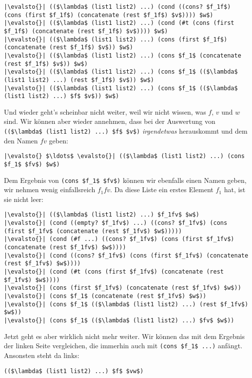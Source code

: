 \begin{enumerate}
\begin{lstlisting}
|\evalsto{}| (($\lambda$ (list1 list2) ...) (cond ((cons? $f_1f$) (cons (first $f_1f$) (concatenate (rest $f_1f$) $v$)))) $w$)
|\evalsto{}| (($\lambda$ (list1 list2) ...) (cond (#t (cons (first $f_1f$) (concatenate (rest $f_1f$) $v$)))) $w$)
|\evalsto{}| (($\lambda$ (list1 list2) ...) (cons (first $f_1f$) (concatenate (rest $f_1f$) $v$)) $w$)
|\evalsto{}| (($\lambda$ (list1 list2) ...) (cons $f_1$ (concatenate (rest $f_1f$) $v$)) $w$)
|\evalsto{}| (($\lambda$ (list1 list2) ...) (cons $f_1$ (($\lambda$ (list1 list2) ...) (rest $f_1f$) $v$)) $w$)
|\evalsto{}| (($\lambda$ (list1 list2) ...) (cons $f_1$ (($\lambda$ (list1 list2) ...) $f$ $v$)) $w$)
\end{lstlisting}
  Und wieder geht's scheinbar nicht weiter, weil wir nicht wissen, was $f$, $v$
  und $w$ sind.  Wir können aber wieder annehmen, dass bei der
  Auswertung von \lstinline{(($\lambda$ (list1 list2) ...) $f$ $v$)}
  \emph{irgendetwas} herauskommt und dem den Namen $fv$ geben:
\begin{lstlisting}
|\evalsto{} $\ldots$ \evalsto{}| (($\lambda$ (list1 list2) ...) (cons $f_1$ $fv$) $w$)
\end{lstlisting}
  Dem Ergebnis von \lstinline{(cons $f_1$ $fv$)} können wir ebenfalls
  einen Namen geben, wir nehmen wenig einfallsreich $f_1fv$.  Da diese
  Liste ein erstes Element $f_1$ hat, ist sie nicht leer:
%
\begin{lstlisting}
|\evalsto{}| (($\lambda$ (list1 list2) ...) $f_1fv$ $w$)
|\evalsto{}| (cond ((empty? $f_1fv$) ...) ((cons? $f_1fv$) (cons (first $f_1fv$ (concatenate (rest $f_1fv$) $w$)))))
|\evalsto{}| (cond (#f ...) ((cons? $f_1fv$) (cons (first $f_1fv$) (concatenate (rest $f_1fv$) $w$))))
|\evalsto{}| (cond ((cons? $f_1fv$) (cons (first $f_1fv$) (concatenate (rest $f_1fv$) $w$))))
|\evalsto{}| (cond (#t (cons (first $f_1fv$) (concatenate (rest $f_1fv$) $w$))))
|\evalsto{}| (cons (first $f_1fv$) (concatenate (rest $f_1fv$) $w$))
|\evalsto{}| (cons $f_1$ (concatenate (rest $f_1fv$) $w$))
|\evalsto{}| (cons $f_1$ (($\lambda$ (list1 list2) ...) (rest $f_1fv$) $w$))
|\evalsto{}| (cons $f_1$ (($\lambda$ (list1 list2) ...) $fv$ $w$))
\end{lstlisting}
  Jetzt geht es aber wirklich nicht mehr weiter.  Wir können das mit
  dem Ergebnis der linken Seite vergleichen, die immerhin auch mit
  \lstinline{(cons $f_1$ ...)} anfängt.  Ansonsten steht da links:
\begin{lstlisting}
(($\lambda$ (list1 list2) ...) $f$ $vw$)
\end{lstlisting}

\end{enumerate}
